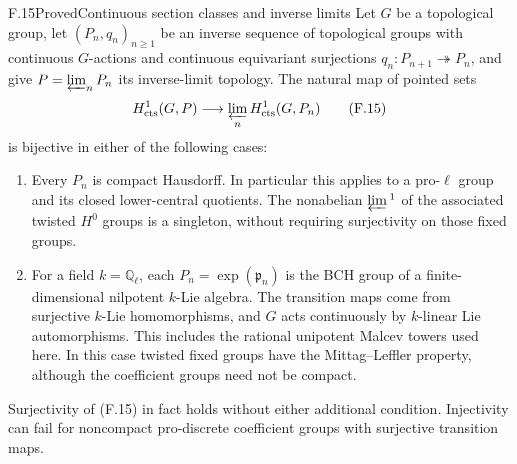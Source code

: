 \begin{statement}{F.15}{Proved}{Continuous section classes and inverse limits}
Let $G$ be a topological group, let $(P_n,q_n)_{n\ge1}$ be an
inverse sequence of topological groups with continuous $G$-actions
and continuous equivariant surjections
$q_n:P_{n+1}\twoheadrightarrow P_n$, and give
$P=\varprojlim_nP_n$ its inverse-limit topology.
The natural map of pointed sets
\[
 H^1_{\rm cts}(G,P)\longrightarrow
       \varprojlim_n H^1_{\rm cts}(G,P_n)                 \tag{F.15}
\]
is bijective in either of the following cases:
\begin{enumerate}
\item Every $P_n$ is compact Hausdorff. In particular this applies
to a pro-$\ell$ group and its closed lower-central quotients.
The nonabelian $\varprojlim{}^1$ of the associated twisted
$H^0$ groups is a singleton, without requiring surjectivity
on those fixed groups.
\item For a field $k=\mathbb Q_\ell$, each
$P_n=\exp(\mathfrak p_n)$ is the BCH group of a finite-dimensional
nilpotent $k$-Lie algebra. The transition maps come from
surjective $k$-Lie homomorphisms, and $G$ acts continuously
by $k$-linear Lie automorphisms. This includes the rational
unipotent Malcev towers used here. In this case twisted
fixed groups have the Mittag--Leffler property, although
the coefficient groups need not be compact.
\end{enumerate}
Surjectivity of (F.15) in fact holds without either additional
condition. Injectivity can fail for noncompact pro-discrete
coefficient groups with surjective transition maps.
\end{statement}
